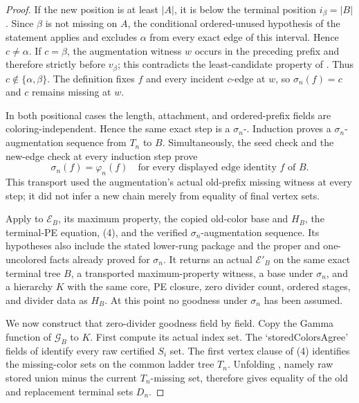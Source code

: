 \begin{proof}
If the new position is at least $|A|$, it is below the terminal position
$i_\beta=|B|$.  Since $\beta$ is not missing on $A$, the conditional
ordered-unused hypothesis of the statement applies and excludes $\alpha$
from every exact edge of this interval.  Hence $c\ne\alpha$.  If
$c=\beta$, the augmentation witness $w$ occurs in the preceding prefix and
therefore strictly before $v_\beta$; this contradicts the least-candidate
property of .  Thus
$c\notin\{\alpha,\beta\}$.  The definition
 fixes $f$ and every incident $c$-edge at
$w$, so $\sigma_n(f)=c$ and $c$ remains missing at $w$.

In both positional cases the length, attachment, and ordered-prefix fields
are coloring-independent.  Hence the same exact step is a
$\sigma_n$-.  Induction proves a
$\sigma_n$-augmentation sequence from $T_n$ to $B$.  Simultaneously, the
seed check and the new-edge check at every induction step prove
\[
 \sigma_n(f)=\varphi_n(f)
 \quad\text{for every displayed edge identity }f\text{ of }B. \tag{8}
\]
This transport used the augmentation's actual old-prefix missing witness at
every step; it did not infer a new chain merely from equality of final
vertex sets.

Apply  to $\mathcal E_B$, its maximum property,
the copied old-color base and $H_B$, the terminal-PE equation, (4), and the
verified $\sigma_n$-augmentation sequence.  Its hypotheses also include
the stated lower-rung package and the proper and one-uncolored facts already
proved for $\sigma_n$.  It returns an actual
 $\mathcal E'_B$ on the same
exact terminal tree $B$, a transported maximum-property witness, a base
under $\sigma_n$, and a hierarchy $K$ with the same core, PE closure,
zero divider count, ordered stages, and divider data as $H_B$.  At this
point no goodness under $\sigma_n$ has been assumed.

We now construct that zero-divider goodness field by field.  Copy the Gamma
function of $\mathcal G_B$ to $K$.  First compute its actual index set.
The `storedColorsAgree' fields of
 identify every raw certified
$S_i$ set.  The first vertex clause of (4) identifies the missing-color
sets on the common ladder tree $T_n$.  Unfolding
, namely raw stored union minus the current
$T_n$-missing set, therefore gives equality of the old and replacement
terminal sets $D_n$.


\end{proof}
